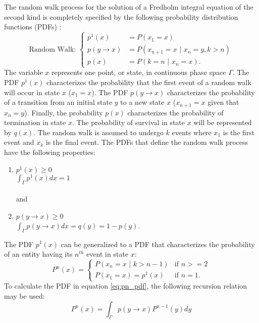 The random walk process for the solution of a Fredholm integral equation of
the second kind is completely specified by the following probability
distribution functions (PDFs) \citep{spanier_monte_1969}: 
\begin{equation}
  \text{Random Walk: }
  \begin{cases}
    p^1(x) & = P(x_1 = x) \\
    p(y \to x) & = P(x_{n+1} = x \text{ | } x_n = y, k > n)  \\
    p(x) & = P(k = n \text{ | } x_n = x).
  \end{cases}
  \label{eq:mc_random_walk_pdfs}
\end{equation}
The variable $x$ represents one point, or state, in continuous phase space 
$\Gamma$. The PDF $p^1(x)$ characterizes the probability that the first event 
of a random walk will occur in state $x$ ($x_1 = x$). The PDF $p(y \to x)$ characterizes the probability of a transition from an initial state $y$ to a new 
state $x$ ($x_{n+1} = x$ given that $x_n = y$). Finally, the probability $p(x)$ 
characterizes the probability of termination in state $x$. The probability
of survival in state $x$ will be represented by $q(x)$. The random walk is 
assumed to undergo $k$ events where $x_1$ is the first event and $x_k$ is the 
final event. The PDFs that define the random walk process have the following 
properties:
\begin{enumerate}
  \item $p^1(x) \geq 0$ \\
  $\int_{\Gamma} p^1(x)dx = 1$ \\ \\
    and
  \item $p(y \to x) \geq 0$ \\
  $\int_{\Gamma} p(y \to x)dx = q(y) = 1 - p(y)$.
\end{enumerate}

The PDF $p^1(x)$ can be generalized to a PDF that characterizes the probability 
of an entity having its $n^{th}$ event in state $x$:
\begin{equation}
  P^n(x) = 
  \begin{cases} 
    P(x_n = x \text{ | } k > n-1) & \text{if } n >= 2 \\
    P(x_1 = x) = p^1(x) & \text{if } n = 1.
  \end{cases}
  \label{eq:pn_pdf}
\end{equation}
To calculate the PDF in equation \ref{eq:pn_pdf}, the following recursion
relation may be used:
\begin{equation}
  P^n(x) = \int_{\Gamma} p(y \to x) P^{n-1}(y)dy
  \label{eq:pn_recursion_rel}
\end{equation}

